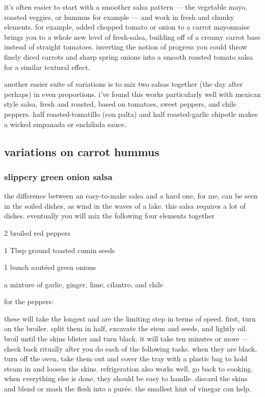 it's often easier to start with a smoother salsa pattern --- the
vegetable mayo, roasted veggies, or hummus for example --- and work in
fresh and chunky elements. for example, added chopped tomato or onion
to a carrot mayonnaise brings you to a whole new level of fresh-salsa,
building off of a creamy carrot base instead of straight
tomatoes. inverting the notion of progress you could throw finely
diced carrots and sharp spring onions into a smooth roasted tomato
salsa for a similar textural effect.

another easier suite of variations is to mix two salsas together (the
day after perhaps) in even proportions. i've found this works
particularly well with mexican style salsa, fresh and roasted, based
on tomatoes, sweet peppers, and chile peppers. half roasted-tomatillo
(con \gls{palta}) and half
roasted-garlic chipotle makes a wicked empanada or enchilada sauce.

\subsection{variations on carrot hummus}

\subsubsection{slippery green onion salsa}

the difference between an easy-to-make salsa and a hard one, for me,
can be seen in the soiled dishes, as wind in the waves of a lake. this
salsa requires a lot of dishes. eventually you will mix the following
four elements together

\begin{ingredients}
  \item 2 broiled red peppers
  \item 1 Tbsp ground toasted cumin seeds
  \item 1 bunch saut\'{e}ed green onions
  \item a mixture of garlic, ginger, lime, cilantro, and chile
\end{ingredients}

for the peppers:

these will take the longest and are the limiting step in terms of
speed. first, turn on the broiler. split them in half, excavate the
stem and seeds, and lightly oil. broil until the skins blister and
turn black. it will take ten minutes or more --- check back ritually
after you do each of the following tasks. when they are black, turn
off the oven, take them out and cover the tray with a plastic bag to
hold steam in and loosen the skins. refrigeration also works well. go
back to cooking. when everything else is done, they should be easy to
handle. discard the skins and blend or mash the flesh into a
pur\'{e}e. the smallest hint of vinegar can help.

